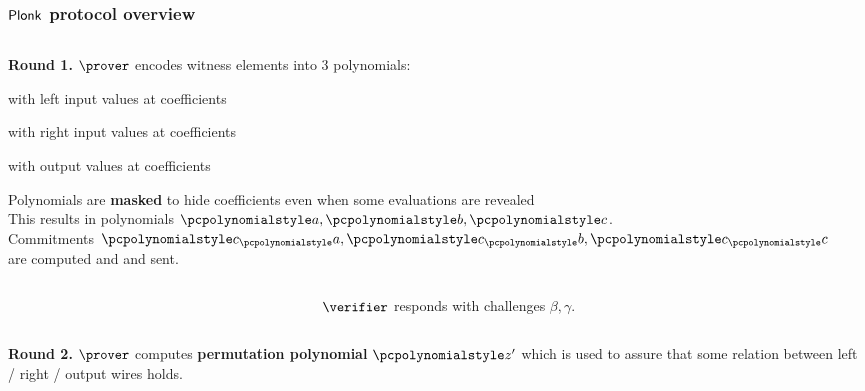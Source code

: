\documentclass[aspectratio=169]{beamer}
\renewcommand{\emph}[1]{\textbf{#1}}
\begin{document}
\begin{frame}
  \frametitle{$\textnormal{\textsf{Plonk}}$ protocol overview}
  \begin{columns}[t]
    \begin{column}{0.5\linewidth}
      \textbf{Round 1.} $\prover$ encodes witness elements into $3$ polynomials:
      \begin{compactitem}
      \item {} with left input values at coefficients
      \item {} with right input values at coefficients
      \item {} with output values at coefficients
      \end{compactitem}
      Polynomials are \emph{masked} to hide coefficients even when some
      evaluations are revealed\\
      This results in polynomials $\p{a}, \p{b}, \p{c}$. \\
      Commitments $\cp{a}, \cp{b}, \cp{c}$ are computed and and sent.\pause
  \end{column}
  \begin{column}{0.5\linewidth}
    \pause
    \end{column}
  \end{columns}
  \begin{columns}
    \begin{column}{0.5\linewidth}
    \end{column}
    \begin{column}{0.5\linewidth}
      $\verifier$ responds with challenges $\beta, \gamma$.\pause
    \end{column}
  \end{columns}
    \begin{columns}
    \begin{column}{0.5\linewidth}
      \textbf{Round 2.} $\prover$ computes \emph{permutation polynomial}
      $\p{z'}$ which is used to assure that some relation between left / right /
      output wires holds.\\

\end{column}
\end{columns}
\end{frame}
\end{document}

